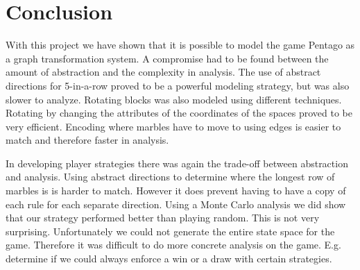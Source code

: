 \section{Conclusion}

With this project we have shown that it is possible to model the game Pentago as a graph transformation system.
A compromise had to be found between the amount of abstraction and the complexity in analysis. The use of abstract directions for 5-in-a-row proved to be a powerful modeling strategy, but was also slower to analyze. 
Rotating blocks was also modeled using different techniques. Rotating by changing the attributes of the coordinates of the spaces proved to be very efficient. Encoding where marbles have to move to using edges is easier to match and therefore faster in analysis.

In developing player strategies there was again the trade-off between abstraction and analysis. Using abstract directions to determine where the longest row of marbles is is harder to match. However it does prevent having to have a copy of each rule for each separate direction.
Using a Monte Carlo analysis we did show that our strategy performed better than playing random. This is not very surprising.
Unfortunately we could not generate the entire state space for the game. Therefore it was difficult to do more concrete analysis on the game. E.g. determine if we could always enforce a win or a draw with certain strategies.
